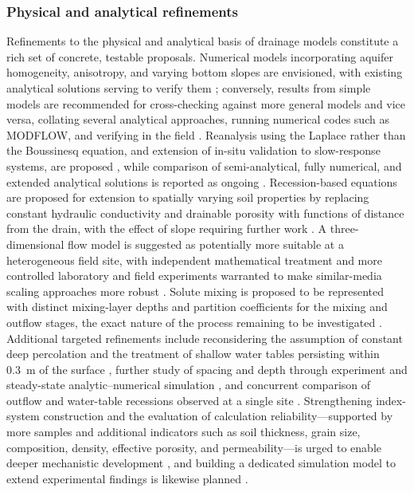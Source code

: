 \subsubsection{Physical and analytical refinements}

Refinements to the physical and analytical basis of drainage models constitute a rich set of concrete, testable proposals. Numerical models incorporating aquifer homogeneity, anisotropy, and varying bottom slopes are envisioned, with existing analytical solutions serving to verify them \parencite{Lin2025}; conversely, results from simple models are recommended for cross-checking against more general models and vice versa, collating several analytical approaches, running numerical codes such as MODFLOW, and verifying in the field \parencite{Kacimov2000}. Reanalysis using the Laplace rather than the Boussinesq equation, and extension of in-situ validation to slow-response systems, are proposed \parencite{Bouarfa2000}, while comparison of semi-analytical, fully numerical, and extended analytical solutions is reported as ongoing \parencite{Wiskow2003}. Recession-based equations are proposed for extension to spatially varying soil properties by replacing constant hydraulic conductivity and drainable porosity with functions of distance from the drain, with the effect of slope requiring further work \parencite{Cooke2001}. A three-dimensional flow model is suggested as potentially more suitable at a heterogeneous field site, with independent mathematical treatment and more controlled laboratory and field experiments warranted to make similar-media scaling approaches more robust \parencite{Mohanty1997}. Solute mixing is proposed to be represented with distinct mixing-layer depths and partition coefficients for the mixing and outflow stages, the exact nature of the process remaining to be investigated \parencite{Shalit1996}. Additional targeted refinements include reconsidering the assumption of constant deep percolation and the treatment of shallow water tables persisting within 0.3~m of the surface \parencite{Kolars2019}, further study of spacing and depth through experiment and steady-state analytic--numerical simulation \parencite{Saptomo2021}, and concurrent comparison of outflow and water-table recessions observed at a single site \parencite{VANDELEUR1959}. Strengthening index-system construction and the evaluation of calculation reliability---supported by more samples and additional indicators such as soil thickness, grain size, composition, density, effective porosity, and permeability---is urged to enable deeper mechanistic development \parencite{Hou2018}, and building a dedicated simulation model to extend experimental findings is likewise planned \parencite{Tao2019b}.

